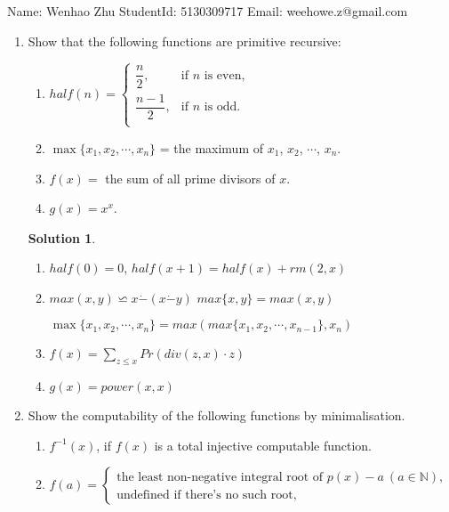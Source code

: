 \documentclass[12pt,a4paper]{article}
\theoremstyle{definition}
\newtheorem*{solution}{Solution}
\numberwithin{equation}{section}
\numberwithin{figure}{section}
\begin{document}
\noindent{}
\begin{center}

\footnotesize{\color{blue} Name: Wenhao Zhu \quad StudentId: 5130309717 \quad Email: weehowe.z@gmail.com}
\end{center}


\begin{enumerate}

\item Show that the following functions are primitive recursive:
\begin{enumerate}
  \item $half(n)=\left\{\begin{array}{ll}
    \dfrac{n}{2}, & \mbox{if $n$ is even,} \\
    \dfrac{n-1}{2}, & \mbox{if $n$ is odd.} \\
  \end{array}\right.$
  \item $\max \{x_1, x_2, \cdots, x_n \}$ = the maximum of $x_1$, $x_2$, $\cdots$, $x_n$.
  \item $f(x)=$ the sum of all prime divisors of $x$.
  \item $g(x)=x^x$.
\end{enumerate}
    \begin{solution}
    \begin{enumerate}
        \item $half(0) = 0$, $half(x+1) = half(x) + rm(2,x)$

        \item $max(x,y) \backsimeq x \dot - (x \dot - y)$
            $max\{x,y\} = max(x,y)$
            
            $\max \{x_1, x_2, \cdots, x_n \} = max( max\{x_1, x_2, \cdots, x_{n-1}\}, x_n)$
        \item $f(x) = \sum_{z \leq x} Pr(div(z,x) \cdot z)$
        
        \item $g(x) = power(x,x)$

    \end{enumerate}

    \end{solution}


  \item Show the computability of the following functions by minimalisation.
    \begin{enumerate}
    \item $f^{-1}(x)$, if $f(x)$ is a total injective computable function.
    \item $f(a)=\left\{\begin{array}{l}
                       \mbox{the least non-negative integral root of } p(x)-a\ (a\in \mathbb{N}),\\
                       \mbox{undefined if there's no such root},
                       \end{array}\right.$  \vspace{1mm}


\end{enumerate}
\end{enumerate}
\end{document}
